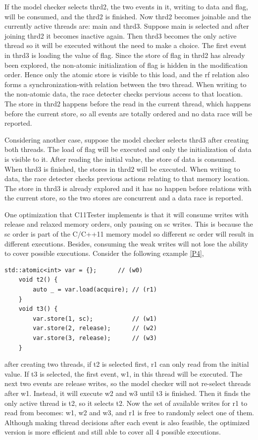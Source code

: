 If the model checker selects thrd2, the two events in it, writing to data and flag, will be consumed, and the thrd2 is finished. Now thrd2 becomes joinable and the currently active threads are: main and thrd3. Suppose main is selected and after joining thrd2 it becomes inactive again. Then thrd3 becomes the only active thread so it will be executed without the need to make a choice. The first event in thrd3 is loading the value of flag. Since the store of flag in thrd2 has already been explored, the non-atomic initialization of flag is hidden in the modification order. Hence only the atomic store is visible to this load, and the rf relation also forms a synchronization-with relation between the two thread. When writing to the non-atomic data, the race detecter checks pervious access to that location. The store in thrd2 happens before the read in the current thread, which happens before the current store, so all events are totally ordered and no data race will be reported. 

Considering another case, suppose the model checker selects thrd3 after creating both threads. The load of flag will be executed and only the initialization of data is visible to it. After reading the initial value, the store of data is consumed. When thrd3 is finished, the stores in thrd2 will be executed. When writing to data, the race detecter checks previous actions relating to that memory location. The store in thrd3 is already explored and it has no happen before relations with the current store, so the two stores are concurrent and a data race is reported. 

One optimization that C11Tester implements is that it will consume writes with release and relaxed memory orders, only pausing on sc writes. This is because the sc order is part of the C/C++11 memory model so different sc order will result in different executions. Besides, consuming the weak writes will not lose the ability to cover possible executions. Consider the following example  \ref{P4}, 
\begin{lstlisting}[caption={P4}, label={P4}]
    std::atomic<int> var = {};      // (w0)
    void t2() {
        auto _ = var.load(acquire); // (r1)
    }
    void t3() {
        var.store(1, sc);           // (w1)
        var.store(2, release);      // (w2)
        var.store(3, release);      // (w3)
    }
\end{lstlisting}
after creating two threads, if t2 is selected first, r1 can only read from the initial value. If t3 is selected, the first event, w1, in this thread will be executed. The next two events are release writes, so the model checker will not re-select threads after w1. Instead, it will execute w2 and w3 until t3 is finished. Then it finds the only active thread is t2, so it selects t2. Now the set of available writes for r1 to read from becomes: w1, w2 and w3, and r1 is free to randomly select one of them. Although making thread decisions after each event is also feasible, the optimized version is more efficient and still able to cover all 4 possible executions.

